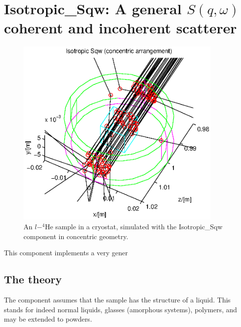 \section{Isotropic\_Sqw: A general $S(q,\omega)$ coherent and incoherent scatterer}
\label{s:isotropic-sqw}


\begin{figure}
  \begin{center}
    \includegraphics[width=0.9\textwidth]{figures/sqw.eps}
  \end{center}
\caption{An $l-^4$He sample in a cryostat, simulated with the Isotropic\_Sqw component in concentric geometry.}
\label{f:isotropic-sqw}
\end{figure}

This component implements a very gener

\subsection{The theory}

The component assumes that the sample has the structure of a liquid. This stands for indeed normal liquids, glasses (amorphous systems), polymers, and may be extended to powders.

